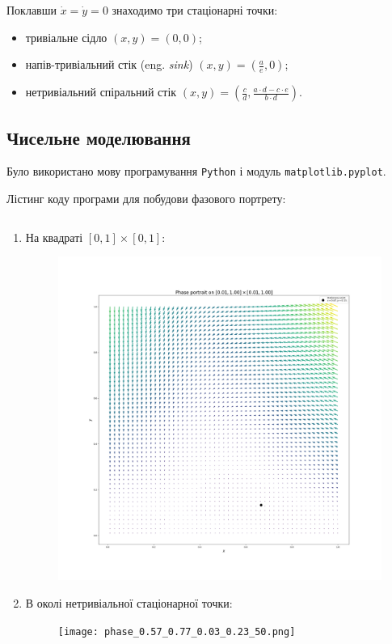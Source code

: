 Поклавши $\dot x = \dot y = 0$ знаходимо три стаціонарні точки: 
\begin{itemize}
	\item тривіальне сідло $(x, y) = (0, 0)$;
	\item напів-тривіальний стік (eng. \textit{sink}) $(x, y) = \left( \frac{a}{e}, 0 \right)$;
	\item нетривіальний спіральний стік $(x, y) = \left(\frac{c}{d}, \frac{a \cdot d - c \cdot e}{b \cdot d}\right)$.
\end{itemize}

\subsection{Чисельне моделювання}

Було використано мову програмування \texttt{Python} і модуль \texttt{matplotlib.pyplot}. \medskip

Лістинг коду програми для побудови фазового портрету:
\inputminted{python}{py/phase_2.py}

\begin{enumerate}
	\item На квадраті $[0, 1] \times [0, 1]$:
	\begin{figure}
		\centering
		\includegraphics[width=\textwidth]{phase_0.01_1.00_0.01_1.00_50_2.png}
	\end{figure}

	\item В околі нетривіальної стаціонарної точки:
	\begin{figure}
		\centering
		\texttt{[image: phase\_0.57\_0.77\_0.03\_0.23\_50.png]}
	\end{figure}
\end{enumerate}

